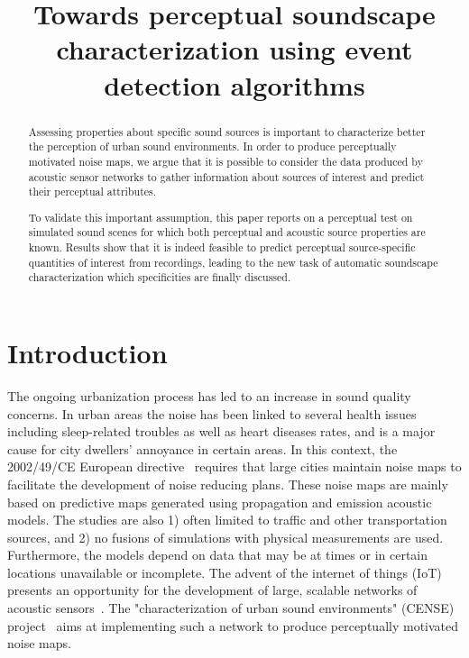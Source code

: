 \documentclass{article}
\title{Towards perceptual soundscape characterization using event detection algorithms}
\begin{document}
\ninept
\maketitle

\begin{sloppy}

\begin{abstract}
Assessing properties about specific sound sources is important to  characterize better the perception of urban sound environments. In order to produce perceptually motivated noise maps, we argue that it is possible to consider the data produced by acoustic sensor networks to gather information about sources of interest and predict their perceptual attributes.

To validate this important assumption, this paper reports on a perceptual test on simulated sound scenes for which both perceptual and acoustic source properties are known. Results show that it is indeed feasible to predict perceptual source-specific quantities of interest from recordings, leading to the new task of automatic soundscape characterization which specificities are finally discussed.

\end{abstract}

\begin{keywords}
\end{keywords}

\section{Introduction}
\label{sec:intro}

The ongoing urbanization process has led to an increase in sound quality concerns. In urban areas the noise has been linked to several health issues including sleep-related troubles as well as heart diseases rates, and is a major cause for city dwellers' annoyance in certain areas. In this context, the 2002/49/CE European directive~\cite{ec2002} requires that large cities maintain noise maps to facilitate the development of noise reducing plans. These noise maps are mainly based on predictive maps generated using propagation and emission acoustic models. The studies are also 1) often limited to traffic and other transportation sources, and 2) no fusions of simulations with physical measurements are used. Furthermore, the models depend on data that may be at times or in certain locations unavailable or incomplete. The advent of the internet of things (IoT) presents an opportunity for the development of large, scalable networks of acoustic sensors~\cite{mydlarz2017, gontier2017}. The "characterization of urban sound environments" (CENSE) project~\cite{picault2017} aims at implementing such a network to produce perceptually motivated noise maps.



\end{sloppy}
\end{document}
